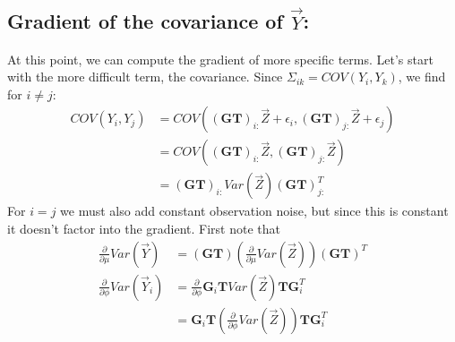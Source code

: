 {\subsection*{Gradient of the covariance of $\vec{Y}$:}
At this point, we can compute the gradient of more specific terms.  Let's start with the more difficult term, the covariance.  Since $\Sigma_{ik} = COV(Y_i, Y_k)$, we find for $i \neq j$:
\begin{align*}
COV(Y_i, Y_j) &= COV((\mathbf{GT})_{i:}\vec{Z} + \epsilon_i, (\mathbf{GT})_{j:}\vec{Z} + \epsilon_j) \\
&= COV((\mathbf{GT})_{i:}\vec{Z}, (\mathbf{GT})_{j:}\vec{Z}) \\
&= (\mathbf{GT})_{i:} Var(\vec{Z}) (\mathbf{GT})_{j:}^T
\end{align*}
For $i = j$ we must also add constant observation noise, but since this is constant it doesn't factor into the gradient.  First note that
\begin{align*}
\frac{\partial}{\partial \mu} Var(\vec{Y}) &= (\mathbf{GT}) \left( \frac{\partial}{\partial \mu} Var(\vec{Z}) \right) (\mathbf{GT})^T \\
\frac{\partial}{\partial \phi} Var(\vec{Y}_i) &= \frac{\partial}{\partial \phi} \mathbf{G}_i \mathbf{T} Var(\vec{Z}) \mathbf{T} \mathbf{G}_i^T \\
&= \mathbf{G}_i \mathbf{T} \left( \frac{\partial}{\partial \phi} Var(\vec{Z}) \right) \mathbf{T} \mathbf{G}_i^T 
\end{align*}

}
